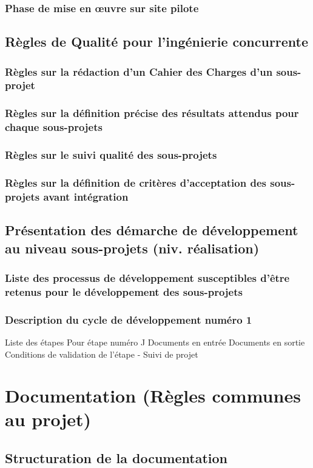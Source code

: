 \documentclass[a4paper]{article}
\begin{document}
\subsubsection{Phase de mise en œuvre sur site pilote}
\subsection{Règles de Qualité pour l'ingénierie concurrente}
\subsubsection{Règles sur la rédaction d'un Cahier des Charges d'un sous-projet}
\subsubsection{Règles sur la définition précise des résultats attendus pour chaque sous-projets}
\subsubsection{Règles sur le suivi qualité des sous-projets}
\subsubsection{Règles sur la définition de critères d'acceptation des sous-projets avant intégration}
\subsection{Présentation des démarche de développement au niveau sous-projets (niv. réalisation)}
\subsubsection{Liste des processus de développement susceptibles d'être retenus pour le développement des sous-projets}
\subsubsection{Description du cycle de développement numéro 1}
Liste des étapes
Pour étape numéro J
Documents en entrée
Documents en sortie
Conditions de validation de l'étape
      -     Suivi de projet


\section{Documentation (Règles communes au projet)}
\subsection{Structuration de la documentation}
\end{document}
